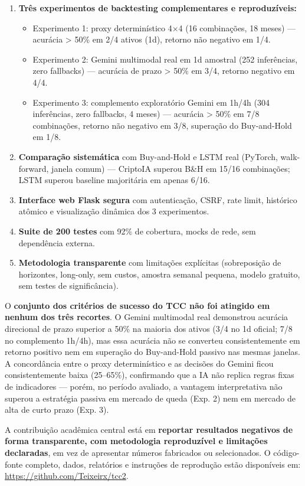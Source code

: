 \documentclass[conference]{IEEEtran}
\begin{document}
\begin{enumerate}
  \item \textbf{Três experimentos de backtesting complementares e reproduzíveis:}
    \begin{itemize}
      \item Experimento 1: proxy determinístico 4×4 (16 combinações, 18 meses) — acurácia > 50\% em 2/4 ativos (1d), retorno não negativo em 1/4.
      \item Experimento 2: Gemini multimodal real em 1d amostral (252 inferências, zero fallbacks) — acurácia de prazo > 50\% em 3/4, retorno negativo em 4/4.
      \item Experimento 3: complemento exploratório Gemini em 1h/4h (304 inferências, zero fallbacks, 4 meses) — acurácia > 50\% em 7/8 combinações, retorno não negativo em 3/8, superação do Buy-and-Hold em 1/8.
    \end{itemize}
  \item \textbf{Comparação sistemática} com Buy-and-Hold e LSTM real (PyTorch, walk-forward, janela comum) — CriptoIA superou B\&H em 15/16 combinações; LSTM superou baseline majoritária em apenas 6/16.
  \item \textbf{Interface web Flask segura} com autenticação, CSRF, rate limit, histórico atômico e visualização dinâmica dos 3 experimentos.
  \item \textbf{Suite de 200 testes} com 92\% de cobertura, mocks de rede, sem dependência externa.
  \item \textbf{Metodologia transparente} com limitações explícitas (sobreposição de horizontes, long-only, sem custos, amostra semanal pequena, modelo gratuito, sem testes de significância).
\end{enumerate}

O \textbf{conjunto dos critérios de sucesso do TCC não foi atingido em nenhum dos três recortes}. O Gemini multimodal real demonstrou acurácia direcional de prazo superior a 50\% na maioria dos ativos (3/4 no 1d oficial; 7/8 no complemento 1h/4h), mas essa acurácia não se converteu consistentemente em retorno positivo nem em superação do Buy-and-Hold passivo nas mesmas janelas. A concordância entre o proxy determinístico e as decisões do Gemini ficou consistentemente baixa (25–65\%), confirmando que a IA não replica regras fixas de indicadores — porém, no período avaliado, a vantagem interpretativa não superou a estratégia passiva em mercado de queda (Exp. 2) nem em mercado de alta de curto prazo (Exp. 3).

A contribuição acadêmica central está em \textbf{reportar resultados negativos de forma transparente, com metodologia reproduzível e limitações declaradas}, em vez de apresentar números fabricados ou selecionados. O código-fonte completo, dados, relatórios e instruções de reprodução estão disponíveis em: \url{https://github.com/Teixeirx/tcc2}.
\end{document}
